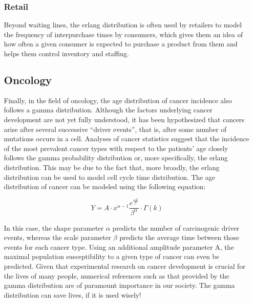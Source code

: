 \documentclass[12pt]{article}
\begin{document}
\subsubsection{Retail}
Beyond waiting lines, the erlang distribution is often used by retailers to model the frequency of interpurchase times
by consumers, which gives them an idea of how often a given consumer is expected to purchase a product from them and
helps them control inventory and staffing.

\subsection{Oncology}
Finally, in the field of oncology, the age distribution of cancer incidence also follows a gamma distribution. Although
the factors underlying cancer development are not yet fully understood, it has been hypothesized that cancers arise
after several successive “driver events”, that is, after some number of mutations occurs in a cell. Analyses of cancer
statistics suggest that the incidence of the most prevalent cancer types with respect to the patients' age closely
follows the gamma probability distribution or, more specifically, the erlang distribution. This may be due to the fact
that, more broadly, the erlang distribution can be used to model cell cycle time
distribution\cite{belikovNumberKeyCarcinogenic2017}. The age distribution of cancer can be modeled using the following equation:

\begin{equation}
	Y = A\cdot x^{\alpha-1}\frac{e^{\frac{-x}{\beta}}}{\beta^\alpha}\cdot\Gamma(k)
\end{equation}

In this case, the shape parameter $\alpha$ predicts the number of carcinogenic driver events, whereas the scale
parameter $\beta$ predicts the average time between those events for each cancer type. Using an additional amplitude
parameter A, the maximal population susceptibility to a given type of cancer can even be
predicted\cite{belikovNumberKeyCarcinogenic2017}. Given that experimental research on cancer development is crucial for
the lives of many people, numerical references such as that provided by the gamma distribution are of paramount
importance in our society. The gamma distribution can save lives, if it is used wisely!

\end{document}
